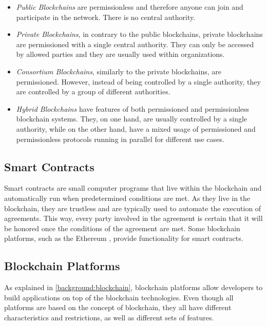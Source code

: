 \begin{itemize}
    \item \textit{Public Blockchains} are permissionless and therefore anyone can join and participate in the network. There is no central authority.

    \item \textit{Private Blockchains}, in contrary to the public blockchains, private blockchains are permissioned with a single central authority. They can only be accessed by allowed parties and they are usually used within organizations.

    \item \textit{Consortium Blockchains}, similarly to the private blockchains, are permissioned. However, instead of being controlled by a single authority, they are controlled by a group of different authorities.

    \item \textit{Hybrid Blockchains} have features of both permissioned and permissionless blockchain systems. They, on one hand, are usually controlled by a single authority, while on the other hand, have a mixed usage of permissioned and permissionless protocols running in parallel for different use cases.
\end{itemize}

\subsection{Smart Contracts}\label{background:smart_contracts}

Smart contracts \cite{8500488} are small computer programs that live within the blockchain and automatically run when predetermined conditions are met. As they live in the blockchain, they are trustless and are typically used to automate the execution of agreements. This way, every party involved in the agreement is certain that it will be honored once the conditions of the agreement are met. Some blockchain platforms, such as the Ethereum \cite{wood2014ethereum}, provide functionality for smart contracts.

\subsection{Blockchain Platforms}\label{background:blockchain_platforms}
 
As explained in \autoref{background:blockchain}, blockchain platforms allow developers to build applications on top of the blockchain technologies. Even though all platforms are based on the concept of blockchain, they all have different characteristics and restrictions, as well as different sets of features.

